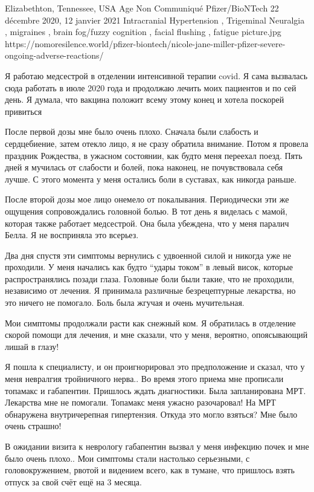          {Elizabethton, Tennessee, USA}
          {Age Non Communiqué}
          {Pfizer/BioNTech}
          {22 décembre 2020, 12 janvier 2021}
          {
            Intracranial Hypertension
            , Trigeminal Neuralgia
            , migraines
            , brain fog/fuzzy cognition
            , facial flushing
            , fatigue
          }
          {picture.jpg}
          {https://nomoresilence.world/pfizer-biontech/nicole-jane-miller-pfizer-severe-ongoing-adverse-reactions/}
          {

Я работаю медсестрой в отделении интенсивной терапии covid. Я сама вызвалась
сюда работать в июле 2020 года и продолжаю лечить моих пациентов и по сей
день. Я думала, что вакцина положит всему этому конец и хотела поскорей
привиться

После первой дозы мне было очень плохо. Сначала были слабость и сердцебиение,
затем отекло лицо, я не сразу обратила внимание. Потом я провела праздник
Рождества, в ужасном состоянии, как будто меня переехал поезд. Пять дней я
мучилась от слабости и болей, пока наконец, не почувствовала себя лучше. С этого
момента у меня остались боли в суставах, как никогда раньше.

После второй дозы мое лицо онемело от покалывания. Периодически эти же ощущения
сопровождались головной болью. В тот день я виделась с мамой, которая также
работает медсестрой. Она была убеждена, что у меня паралич Белла. Я не
восприняла это всерьез.

Два дня спустя эти симптомы вернулись с удвоенной силой и никогда уже не
проходили. У меня начались как будто “удары током” в левый висок, которые
распространялись позади глаза. Головные боли были такие, что не проходили,
независимо от лечения. Я принимала различные безрецептурные лекарства, но это
ничего не помогало. Боль была жгучая и очень мучительная.

Мои симптомы продолжали расти как снежный ком. Я обратилась в отделение скорой
помощи для лечения, и мне сказали, что у меня, вероятно, опоясывающий лишай в
глазу!

Я пошла к специалисту, и он проигнорировал это предположение и сказал, что у
меня невралгия тройничного нерва.. Во время этого приема мне прописали топамакс
и габапентин. Пришлось ждать диагностики. Была запланирована МРТ. Лекарства мне
не помогали. Топамакс меня ужасно разочаровал! На МРТ обнаружена внутричерепная
гипертензия. Откуда это могло взяться? Мне было очень страшно!

В ожидании визита к неврологу габапентин вызвал у меня инфекцию почек и мне было
очень плохо.. Мои симптомы стали настолько серьезными, с головокружением, рвотой
и видением всего, как в тумане, что пришлось взять отпуск за свой счёт ещё на 3
месяца.

}
